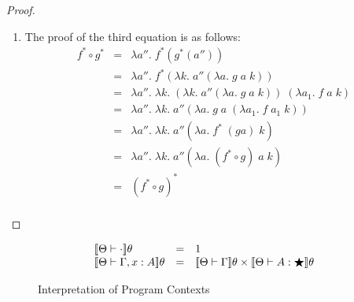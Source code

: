 \begin{proof}
\begin{enumerate}
\item The proof of the third equation is as follows: 
  \begin{displaymath}
    \begin{array}{lcl}
      f^* \circ g^* 
      & = & \lambda a''.\; f^*(g^*(a'')) \\
      & = & \lambda a''.\; f^*(\lambda k.\;a''(\lambda a.\;g\;a\;k)) \\
      & = & \lambda a''.\;\lambda k.\;
              (\lambda k.\;a''(\lambda a.\;g\;a\;k))\;
              (\lambda a_1.\; f\;a\;k) \\
      & = & \lambda a''.\;\lambda k.\;
              a''(\lambda a.\;g\;a\;(\lambda a_1.\;f\;a_1\;k)) \\
      & = & \lambda a''.\;\lambda k.\;
               a''(\lambda a.\;f^*\; (g a)\; k) \\
      & = & \lambda a''.\;\lambda k.\;
               a''(\lambda a.\;(f^* \circ g)\;a\;k) \\
      & = & (f^* \circ g)^* \\       
    \end{array}
  \end{displaymath}
\end{enumerate}
\end{proof}

\begin{figure}
\begin{displaymath}
  \begin{array}{lcl}
  \interp{\Theta \vdash \cdot}\theta & = & 1 \\
  \interp{\Theta \vdash \Gamma, x:A}\theta & = & 
       \interp{\Theta \vdash \Gamma}\theta 
       \times 
       \interp{\Theta \vdash A:\bigstar}\theta \\
  \end{array}
\end{displaymath}
\caption{Interpretation of Program Contexts}
\label{lang-context-interp}
\end{figure}

